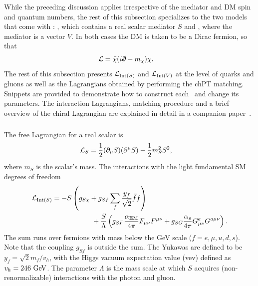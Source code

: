 While the preceding discussion applies irrespective of the mediator and DM spin and quantum numbers, the rest of this subsection specializes to the two models that come with \hazma: \sm, which contains a real scalar mediator $S$ and \vm, where the mediator is a vector $V$.
 In both cases the DM is taken to be a Dirac fermion, so that
\begin{align}
    \L &= \bar{\chi} (i \slashed \d - m_\chi) \chi.
\end{align}
The rest of this subsection presents $\mathcal{L}_{{\mathrm{Int}}(S)}$ and $\mathcal{L}_{{\mathrm{Int}}(V)}$ at the level of quarks and gluons as well as the Lagrangians obtained by performing the chPT matching. Snippets are provided to demonstrate how to construct each \theory\ and change its parameters. The interaction Lagrangians, matching procedure and a brief overview of the chiral Lagrangian are explained in detail in a companion paper~\cite{matching_paper}.

\subsubsection{\sm}

The free Lagrangian for a real scalar is
\begin{align}
    \mathcal{L}_S &= \frac{1}{2} (\partial_\mu S) (\partial^\mu S) - \frac{1}{2} m_S^2 S^2,
\end{align}
where $m_S$ is the scalar's mass. The interactions with the light fundamental SM degrees of freedom
\begin{align}
    \mathcal{L}_{{\mathrm{Int}}(S)} &= -S \left( g_{S\chi} + g_{Sf} \sum_f \frac{y_f}{\sqrt{2}} \bar{f} f \right)\\
                    &\hspace{2cm} + \frac{S}{\Lambda} \left( g_{SF} \frac{\alpha_{\mathrm{EM}}}{4\pi} F_{\mu\nu} F^{\mu\nu} + g_{SG} \frac{\alpha_s}{4\pi} G_{\mu\nu}^a G^{a \mu\nu} \right).
\end{align}
The sum runs over fermions with mass below the GeV scale ($f = e, \mu, u, d, s$). Note that the coupling $g_{Sf}$ is outside the sum. The Yukawas are defined to be $y_f = \sqrt{2} m_f / v_h$, with the Higgs vacuum expectation value (vev) defined as $v_h = 246{~\mathrm{GeV}}$. The parameter $\Lambda$ is the mass scale at which $S$ acquires (non-renormalizable) interactions with the photon and gluon.

